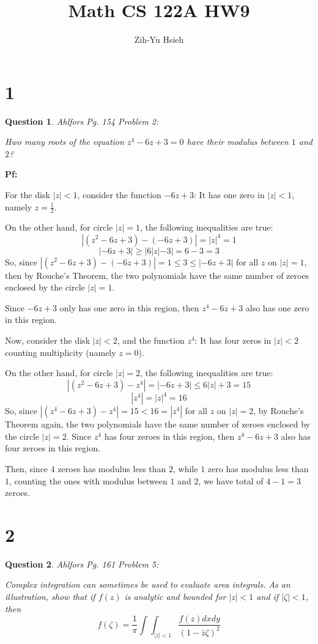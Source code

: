 \documentclass{article}
\title{Math CS 122A HW9}
\author{Zih-Yu Hsieh}
\newtheorem{question}{Question}
\begin{document}
\maketitle

\section*{1} 
\begin{myBox}[]{}
    \begin{question}
        Ahlfors Pg. 154 Problem 2:

        Hwo many roots of the equation $z^4-6z+3=0$ have their modulus between $1$ and $2$?
    \end{question}
\end{myBox}

\textbf{Pf:}

For the disk $|z|<1$, consider the function $-6z+3$: It has one zero in $|z|<1$, namely $z=\frac{1}{2}$.

On the other hand, for circle $|z|=1$, the following inequalities are true:
$$|(z^2-6z+3)-(-6z+3)| = |z|^4 = 1$$ 
$$|-6z+3| \geq |6|z|-3| = 6-3 = 3$$
So, since $|(z^2-6z+3)-(-6z+3)|=1 \leq3\leq |-6z+3|$ for all $z$ on $|z|=1$, then by Rouche's Theorem,
the two polynomials have the same number of zeroes enclosed by the circle $|z|=1$.

Since $-6z+3$ only has one zero in this region, then $z^4-6z+3$ also has one zero in this region.

\hfil

Now, consider the disk $|z|<2$, and the function $z^4$: It has four zeros in $|z|<2$ counting multiplicity (namely $z=0$).

On the other hand, for circle $|z|=2$, the following inequalities are true:
$$|(z^2-6z+3)-z^4| = |-6z+3| \leq 6|z|+3 = 15$$
$$|z^4| = |z|^4 = 16$$
So, since $|(z^4-6z+3)-z^4| = 15<16=|z^4|$ for all $z$ on $|z|=2$, by Rouche's Theorem again, the two polynomials have the same number of zeroes enclosed by the circle $|z|=2$.
Since $z^4$ has four zeroes in this region, then $z^4-6z+3$ also has four zeroes in this region.

\hfil

Then, since $4$ zeroes has modulus less than $2$, while $1$ zero has modulus less than $1$, counting the ones with modulus between $1$ and $2$,
we have total of $4-1=3$ zeroes.

\break

\section*{2}
\begin{myBox}[]{}
    \begin{question}
        Ahlfors Pg. 161 Problem 5:

        Complex integration can sometimes be used to evaluate area integrals. 
        As an illustration, show that if $f(z)$ is analytic and bounded for $|z|<1$ and if $|\zeta|<1$, then
        $$f(\zeta)=\frac{1}{\pi}\int\int_{|z|<1}\frac{f(z)dxdy}{(1-\bar{z}\zeta)^2}$$
    \end{question}
\end{myBox}
\end{document}
